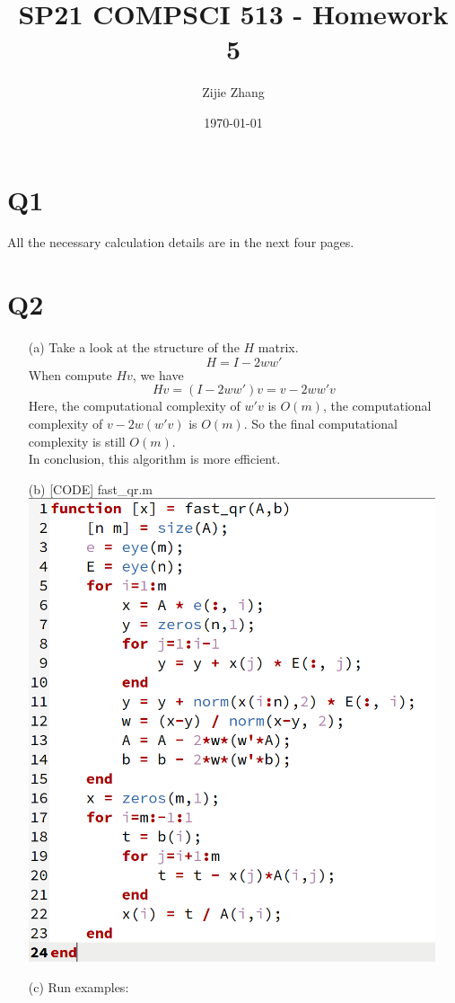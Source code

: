 \documentclass{article}
\title{SP21 COMPSCI 513 - Homework 5}
\author{Zijie Zhang}
\date\today
\begin{document}
\maketitle
\section*{Q1}
All the necessary calculation details are in the next four pages.

\section*{Q2}
\begin{itemize}
    \item[(a)] Take a look at the structure of the $H$ matrix.
                    $$H = I - 2ww'$$
                When compute $Hv$, we have $$Hv = (I - 2ww')v = v - 2 ww'v$$
                Here, the computational complexity of $w'v$ is $O(m)$, the computational complexity of $v - 2w(w'v)$ is $O(m)$. So the final computational complexity is still $O(m)$.\\
                In conclusion, this algorithm is more efficient.
    \item[(b)] [CODE] fast\_qr.m\\
                \includegraphics[width=12cm]{fast_qr.png}
    \item[(c)] Run examples:\\

\end{itemize}
\end{document}
